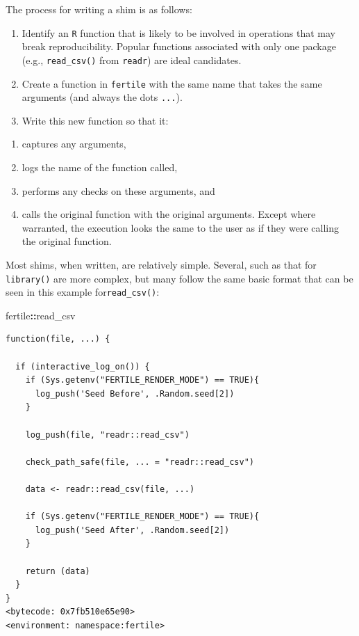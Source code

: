 \documentclass[12pt,twoside]{reedthesis}
\newenvironment{Shaded}{\begin{snugshade}}{\end{snugshade}}
\newcommand{\OperatorTok}[1]{\textcolor[rgb]{0.81,0.36,0.00}{\textbf{#1}}}
\newcommand{\NormalTok}[1]{#1}
\providecommand{\tightlist}{%
  \setlength{\itemsep}{0pt}\setlength{\parskip}{0pt}}
\begin{document}
The process for writing a shim is as follows:
\begin{enumerate}
\def\labelenumi{\arabic{enumi}.}
\item
  Identify an \texttt{R} function that is likely to be involved in
  operations that may break reproducibility. Popular functions
  associated with only one package (e.g., \texttt{read\_csv()} from
  \texttt{readr}) are ideal candidates.
\item
  Create a function in \texttt{fertile} with the same name that takes
  the same arguments (and always the dots \texttt{...}).
\item
  Write this new function so that it:
\end{enumerate}
\begin{enumerate}
\def\labelenumi{\alph{enumi})}
\tightlist
\item
  captures any arguments,
\item
  logs the name of the function called,
\item
  performs any checks on these arguments, and
\item
  calls the original function with the original arguments. Except where
  warranted, the execution looks the same to the user as if they were
  calling the original function.
\end{enumerate}
Most shims, when written, are relatively simple. Several, such as that
for \texttt{library()} are more complex, but many follow the same basic
format that can be seen in this example for\texttt{read\_csv()}:
\begin{Shaded}
\begin{Highlighting}[]
\NormalTok{fertile}\OperatorTok{::}\NormalTok{read_csv}
\end{Highlighting}
\end{Shaded}
\begin{verbatim}
function(file, ...) {

  if (interactive_log_on()) {
    if (Sys.getenv("FERTILE_RENDER_MODE") == TRUE){
      log_push('Seed Before', .Random.seed[2])
    }

    log_push(file, "readr::read_csv")

    check_path_safe(file, ... = "readr::read_csv")

    data <- readr::read_csv(file, ...)

    if (Sys.getenv("FERTILE_RENDER_MODE") == TRUE){
      log_push('Seed After', .Random.seed[2])
    }

    return (data)
  }
}
<bytecode: 0x7fb510e65e90>
<environment: namespace:fertile>
\end{verbatim}
\end{document}
